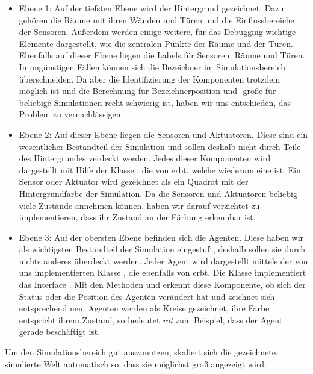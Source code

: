 \begin{itemize}
\item Ebene 1: Auf der tiefsten Ebene wird der Hintergrund gezeichnet. Dazu gehören die Räume mit ihren Wänden und Türen und die Einflussbereiche der Sensoren. Außerdem werden einige weitere, für das Debugging wichtige Elemente dargestellt, wie die zentralen Punkte der Räume und der Türen. Ebenfalls auf dieser Ebene liegen die Labels für Sensoren, Räume und Türen. In ungünstigen Fällen können sich die Bezeichner im Simulationsbereich überschneiden. Da aber die Identifizierung der Komponenten trotzdem möglich ist und die Berechnung für Bezeichnerposition und -größe für beliebige Simulationen recht schwierig ist, haben wir uns entschieden, das Problem zu vernachlässigen.

\item Ebene 2: Auf dieser Ebene liegen die Sensoren und Aktuatoren. Diese sind ein wesentlicher Bestandteil der Simulation und sollen deshalb nicht durch Teile des Hintergrundes verdeckt werden. Jedes dieser Komponenten wird dargestellt mit Hilfe der Klasse , die von  erbt, welche wiederum eine  ist. Ein Sensor oder Aktuator wird gezeichnet als ein Quadrat mit der Hintergrundfarbe der Simulation. Da die Sensoren und Aktuatoren beliebig viele Zustände annehmen können, haben wir darauf verzichtet zu implementieren, dass ihr Zustand an der Färbung erkennbar ist.

\item Ebene 3: Auf der obersten Ebene befinden sich die Agenten. Diese haben wir als wichtigsten Bestandteil der Simulation eingestuft, deshalb sollen sie durch nichts anderes überdeckt werden. Jeder Agent wird dargestellt mittels der von uns implementierten Klasse , die ebenfalls von  erbt. Die Klasse  implementiert das Interface . Mit den Methoden  und  erkennt diese Komponente, ob sich der Status oder die Position des Agenten verändert hat und zeichnet sich entsprechend neu. Agenten werden als Kreise gezeichnet, ihre Farbe entspricht ihrem Zustand, so bedeutet \textit{rot} zum Beispiel, dass der Agent gerade beschäftigt ist.
\end{itemize} 

Um den Simulationsbereich gut auszunutzen, skaliert sich die gezeichnete, simulierte Welt automatisch so, dass sie möglichst groß angezeigt wird.

